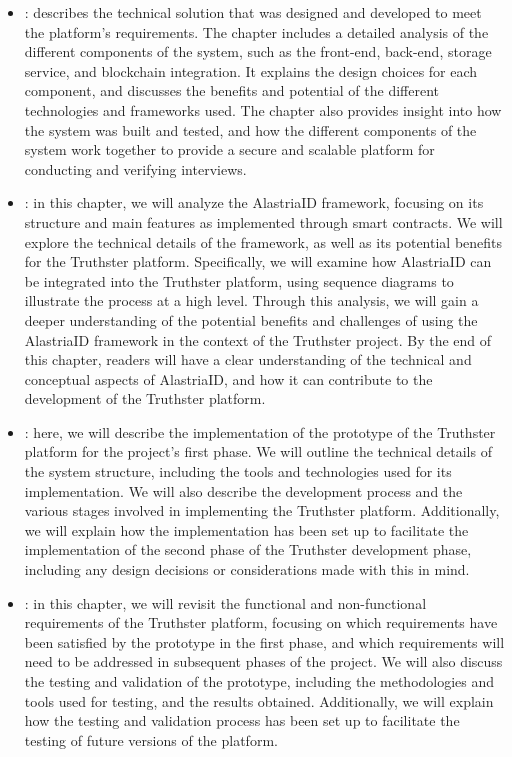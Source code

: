 \documentclass[target=mst,aauheader=]{thud}
\begin{document}
\begin{itemize}
    \item \textbf{}: describes the technical solution that was designed and developed to meet the platform's requirements. The chapter includes a detailed analysis of the different components of the system, such as the front-end, back-end, storage service, and blockchain integration. It explains the design choices for each component, and discusses the benefits and potential of the different technologies and frameworks used. The chapter also provides insight into how the system was built and tested, and how the different components of the system work together to provide a secure and scalable platform for conducting and verifying interviews.
    \item \textbf{}: in this chapter, we will analyze the AlastriaID framework, focusing on its structure and main features as implemented through smart contracts. We will explore the technical details of the framework, as well as its potential benefits for the Truthster platform. Specifically, we will examine how AlastriaID can be integrated into the Truthster platform, using sequence diagrams to illustrate the process at a high level. Through this analysis, we will gain a deeper understanding of the potential benefits and challenges of using the AlastriaID framework in the context of the Truthster project. By the end of this chapter, readers will have a clear understanding of the technical and conceptual aspects of AlastriaID, and how it can contribute to the development of the Truthster platform.
    \item \textbf{}: here, we will describe the implementation of the prototype of the Truthster platform for the project's first phase. We will outline the technical details of the system structure, including the tools and technologies used for its implementation. We will also describe the development process and the various stages involved in implementing the Truthster platform. Additionally, we will explain how the implementation has been set up to facilitate the implementation of the second phase of the Truthster development phase, including any design decisions or considerations made with this in mind.
    \item \textbf{}: in this chapter, we will revisit the functional and non-functional requirements of the Truthster platform, focusing on which requirements have been satisfied by the prototype in the first phase, and which requirements will need to be addressed in subsequent phases of the project. We will also discuss the testing and validation of the prototype, including the methodologies and tools used for testing, and the results obtained. Additionally, we will explain how the testing and validation process has been set up to facilitate the testing of future versions of the platform.

\end{itemize}
\end{document}
